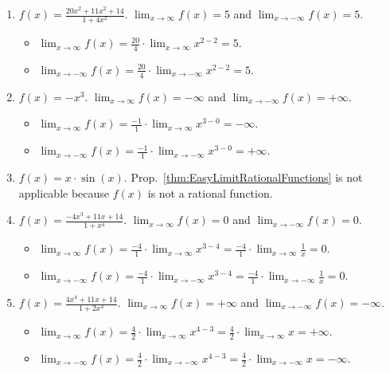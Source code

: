 \begin{enumerate}
\renewcommand{\labelenumi}{(\alph{enumi})}
\setlength{\itemsep}{.3cm}
    
\item $f(x) = \frac{20 x^2 + 11 x^2 + 14}{1 + 4 x^2}$. \Ans $\displaystyle\lim_{x \to \infty} f(x) = 5$ and $\displaystyle\lim_{x \to -\infty} f(x) = 5$.

\begin{itemize}
    \item $\lim_{x \to \infty} f(x) = \frac{20}{4} \cdot\displaystyle\lim_{x \to \infty} x^{2-2} = 5.$
    \item $\lim_{x \to -\infty} f(x) = \frac{20}{4} \cdot\displaystyle\lim_{x \to -\infty} x^{2-2} = 5.$
\end{itemize}




\item  $f(x) = -x^3$.  \Ans $\displaystyle\lim_{x \to \infty} f(x) = -\infty$ and $\displaystyle\lim_{x \to -\infty} f(x) = +\infty$.


\begin{itemize}
    \item $\lim_{x \to \infty} f(x) = \frac{-1}{1} \cdot\displaystyle\lim_{x \to \infty} x^{3-0} = -\infty.$
    \item $\lim_{x \to -\infty} f(x) =  \frac{-1}{1} \cdot \displaystyle\lim_{x \to -\infty} x^{3-0} = + \infty.$
\end{itemize}

\item  $f(x) = x \cdot \sin(x)$. \Ans Prop.~\ref{thm:EasyLimitRationalFunctions} is not applicable because $f(x)$ is not a rational function.

\item  $f(x) = \frac{-4x^3 + 11 x + 14}{1 + x^4}$. \Ans $\displaystyle\lim_{x \to \infty} f(x) = 0$ and $\displaystyle\lim_{x \to -\infty} f(x) = 0$.
\begin{itemize}
    \item $\lim_{x \to \infty} f(x) = \frac{-4}{1} \cdot\displaystyle\lim_{x \to \infty} x^{3-4} = \frac{-4}{1} \cdot\displaystyle\lim_{x \to \infty} \frac{1}{x}= 0.$
    \item $\lim_{x \to -\infty} f(x) = \frac{-4}{1} \cdot\displaystyle\lim_{x \to -\infty} x^{3-4} = \frac{-4}{1} \cdot\displaystyle\lim_{x \to -\infty} \frac{1}{x} =0.$
\end{itemize}


\item $f(x) = \frac{4x^4 + 11 x + 14}{1 + 2x^3}$. \Ans $\displaystyle\lim_{x \to \infty} f(x) = +\infty$ and $\displaystyle\lim_{x \to -\infty} f(x) = -\infty$.
\begin{itemize}
    \item $\displaystyle\lim_{x \to \infty} f(x) = \frac{4}{2} \cdot \displaystyle\lim_{x \to \infty} x^{4-3} = \frac{4}{2} \cdot \displaystyle\lim_{x \to \infty}x = +\infty.$
    \item $\displaystyle\lim_{x \to -\infty} f(x) = \frac{4}{2} \cdot \displaystyle\lim_{x \to -\infty} x^{4-3} = \frac{4}{2} \cdot \displaystyle\lim_{x \to -\infty}x = -\infty.$
\end{itemize}

\end{enumerate}
